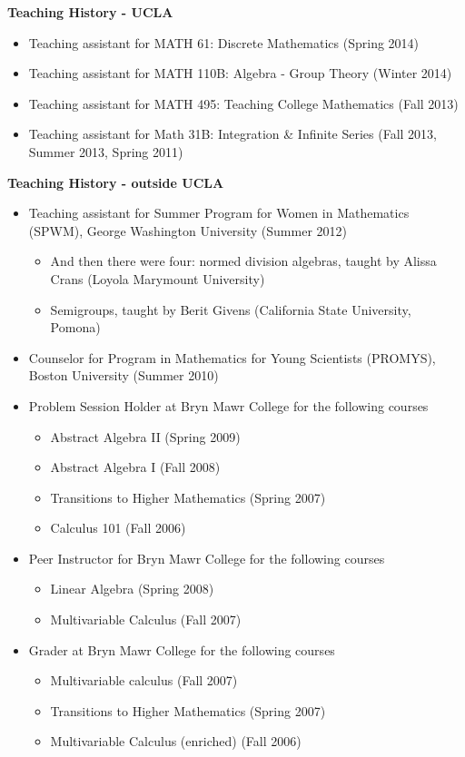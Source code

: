 \documentclass[11pt]{article}
\theoremstyle{plain} \numberwithin{equation}{section}
\theoremstyle{definition}
\begin{document}

{\large\textbf{Teaching History - UCLA}} \medskip

\begin{itemize} 
\item Teaching assistant for MATH 61: Discrete Mathematics (Spring 2014)
\item Teaching assistant for MATH 110B: Algebra - Group Theory (Winter 2014) 
\item Teaching assistant for MATH 495: Teaching College Mathematics (Fall 2013)
\item Teaching assistant for Math 31B: Integration \& Infinite Series (Fall 2013, Summer 2013, Spring 2011)
\end{itemize} \medskip

{\large\textbf{Teaching History - outside UCLA}} \medskip

\begin{itemize} 
\item Teaching assistant for Summer Program for Women in Mathematics (SPWM), George Washington University (Summer 2012)
	\begin{itemize}
	\item And then there were four: normed division algebras, taught by Alissa Crans (Loyola Marymount University)
	\item Semigroups, taught by Berit Givens (California State University, Pomona)
	\end{itemize} 
\item Counselor for Program in Mathematics for Young Scientists (PROMYS), Boston University (Summer 2010)
\item Problem Session Holder at Bryn Mawr College for the following courses
	\begin{itemize}
	\item Abstract Algebra II (Spring 2009)
	\item Abstract Algebra I (Fall 2008)
	\item Transitions to Higher Mathematics (Spring 2007)
	\item Calculus 101 (Fall 2006)
	\end{itemize}
\item Peer Instructor for Bryn Mawr College for the following courses
	\begin{itemize}
	\item Linear Algebra (Spring 2008)
	\item Multivariable Calculus (Fall 2007)
	\end{itemize}
\item Grader at Bryn Mawr College for the following courses
	\begin{itemize}
	\item Multivariable calculus (Fall 2007)
	\item Transitions to Higher Mathematics (Spring 2007)
	\item Multivariable Calculus (enriched) (Fall 2006)
	\end{itemize}
\end{itemize}
\end{document}
